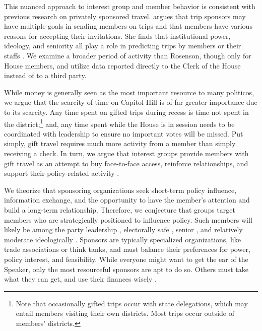 \documentclass[12pt]{article}                           %
\begin{document}
This nuanced approach to interest group and member behavior is consistent with previous research on privately sponsored travel. \cite{Rosenson2009} argues that trip sponsors may have multiple goals in sending members on trips and that members have various reasons for accepting their invitations. She finds that institutional power, ideology, and seniority all play a role in predicting trips by members or their staffs \citep{Rosenson2009}. We examine a broader period of activity than Rosenson, though only for House members, and utilize data reported directly to the Clerk of the House instead of to a third party.

While money is generally seen as the most important resource to many politicos, we argue that the scarcity of time on Capitol Hill is of far greater importance due to its scarcity. Any time spent on gifted trips during recess is time not spent in the district;\footnote{Note that occasionally gifted trips occur with state delegations, which may entail members visiting their own districts. Most trips occur outside of members' districts.} and, any time spent while the House is in session needs to be coordinated with leadership to ensure no important votes will be missed. Put simply, gift travel requires much more activity from a member than simply receiving a check. In turn, we argue that interest groups provide members with gift travel as an attempt to buy face-to-face access, reinforce relationships, and support their policy-related activity \citep{Hall2006}.

We theorize that sponsoring organizations seek short-term policy influence, information exchange, and the opportunity to have the member's attention and build a long-term relationship. Therefore, we conjecture that groups target members who are strategically positioned to influence policy. Such members will likely be among the party leadership \citep{Cox2005,Rosenson2009}, electorally safe \citep{Grimmer2013a}, senior \citep{Snyder1992,Rosenson2009}, and relatively moderate ideologically \citep{Alduncin2017}. Sponsors are typically specialized organizations, like trade associations or think tanks, and must balance their preferences for power, policy interest, and feasibility. While everyone might want to get the ear of the Speaker, only the most resourceful sponsors are apt to do so. Others must take what they can get, and use their finances wisely \citep{Barber2017}.
\end{document}
